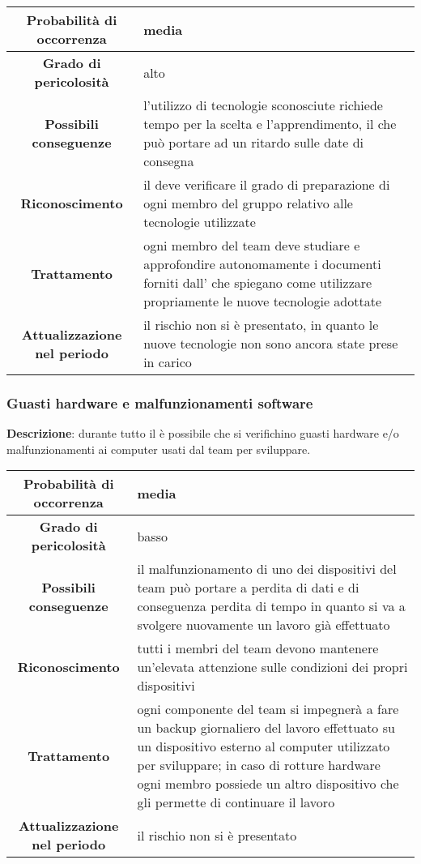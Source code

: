 \documentclass[PianoDiProgetto.tex]{subfiles}
\begin{document}
			\begin{center}
				\begin{tabular}{ | c | p{10cm} |}
					\hline
					\textbf{Probabilità di occorrenza} & media  \\ \hline
					\textbf{Grado di pericolosità} & alto \\ \hline
					\textbf{Possibili conseguenze} & l'utilizzo di tecnologie sconosciute richiede tempo per la scelta e l'apprendimento, il che può portare ad un ritardo sulle date di consegna \\ \hline
					\textbf{Riconoscimento} & il \RESP{} deve verificare il grado di preparazione di ogni membro del gruppo relativo alle tecnologie utilizzate \\ \hline
					\textbf{Trattamento} &  ogni membro del team deve studiare e approfondire autonomamente i documenti forniti dall'\AMM{} che spiegano come utilizzare propriamente le nuove tecnologie adottate \\ \hline
					\textbf{Attualizzazione nel periodo} &  il rischio non si è presentato, in quanto le nuove tecnologie non sono ancora state prese in carico \\
					\hline	
				\end{tabular}
		 	\end{center}


	
	\subsubsection{Guasti hardware e malfunzionamenti software}
		\label{sec:ghs}

		 \textbf{Descrizione}: durante tutto il  è possibile che si verifichino guasti hardware e/o malfunzionamenti  ai computer usati dal team per sviluppare.
		 
		 \begin{center}
		 	\begin{tabular}{ | c | p{10cm} |}
		 		\hline
		 		\textbf{Probabilità di occorrenza} & media  \\ \hline
		 		\textbf{Grado di pericolosità} & basso \\ \hline
		 		\textbf{Possibili conseguenze} & il malfunzionamento di uno dei dispositivi del team può portare a perdita di dati e di conseguenza perdita di tempo in quanto si va a svolgere nuovamente un lavoro già effettuato \\ \hline
		 		\textbf{Riconoscimento} & tutti i membri del team devono mantenere un'elevata attenzione sulle condizioni dei propri dispositivi \\ \hline
		 		\textbf{Trattamento} & ogni componente del team si impegnerà a fare un backup giornaliero del lavoro effettuato su un dispositivo esterno al computer utilizzato per sviluppare; in caso di rotture hardware ogni membro possiede un altro dispositivo che gli permette di continuare il lavoro \\ \hline
		 		\textbf{Attualizzazione nel periodo} &  il rischio non si è presentato \\
		 		\hline	
		 	\end{tabular}
		 \end{center}	
		
\end{document}
